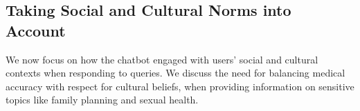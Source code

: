 









\subsection{Taking Social and Cultural Norms into Account}
We now focus on how the chatbot engaged with users' social and cultural contexts when responding to queries. We discuss the need for balancing medical accuracy with respect for cultural beliefs, when providing information on sensitive topics like family planning and sexual health. 

